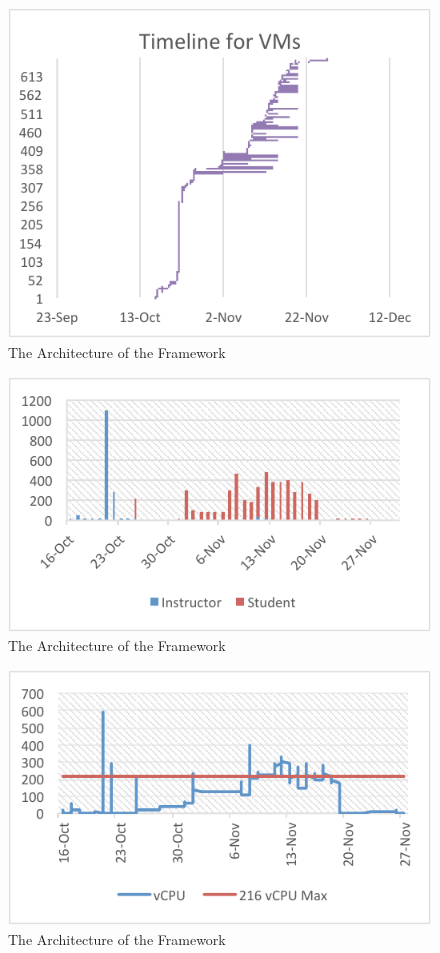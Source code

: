 \documentclass{sig-alternate}
\begin{document}
\begin{figure}[htb] 
  \centering 
    \includegraphics[width=1.0\columnwidth]{images/fig3.pdf} 
  \caption{The Architecture of the Framework}\label{F:fig3} 
\end{figure} 

\begin{figure}[htb] 
  \centering 
    \includegraphics[width=1.0\columnwidth]{images/fig4.pdf} 
  \caption{The Architecture of the Framework}\label{F:fig4} 
\end{figure} 

\begin{figure}[htb] 
  \centering 
    \includegraphics[width=1.0\columnwidth]{images/fig5.pdf} 
  \caption{The Architecture of the Framework}\label{F:fig5} 
\end{figure} 
\end{document}

